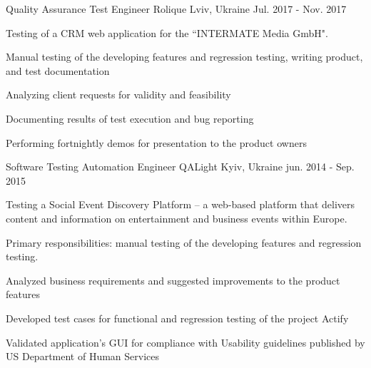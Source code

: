 \begin{cventries}
  \cventry
    {Quality Assurance Test Engineer} %
    {Rolique} %
    {Lviv, Ukraine} %
    {Jul. 2017 - Nov. 2017} %
    {
      \begin{cvitems} 
      \item{Testing of a CRM web application for the “INTERMATE Media GmbH".}
        \item {Manual testing of the developing features and regression testing, writing product, and test documentation}
        \item {Analyzing client requests for validity and feasibility}
        \item {Documenting results of test execution and bug reporting}
        \item {Performing fortnightly demos for presentation to the product owners}
      \end{cvitems}
    }

  \cventry
    {Software Testing Automation Engineer} %
    {QALight} %
    {Kyiv, Ukraine} %
    {jun. 2014 - Sep. 2015} %
    {
      \begin{cvitems} %
      {
      Testing a Social Event Discovery Platform – a web-based platform that delivers content and information on entertainment and business events within Europe.
      }
      \item {Primary responsibilities: manual testing of the developing features and regression testing.}
        \item {Analyzed business requirements and suggested improvements to the product features}
        \item {Developed test cases for functional and regression testing of the project Actify}
        \item {Validated application’s GUI for compliance with Usability guidelines published by US Department of Human Services}
      \end{cvitems}
    }




\end{cventries}

